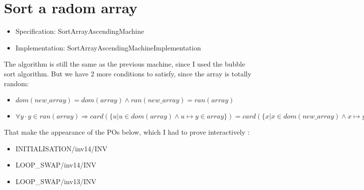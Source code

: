 \section{Sort a radom array}

\begin{itemize}
\item Specification: SortArrayAscendingMachine
\item Implementation: SortArrayAscendingMachineImplementation
\end{itemize}
The algorithm is still the same as the previous machine, since I used the bubble sort algorithm. 
But we have 2 more conditions to satisfy, since the array is totally random: 
\begin{itemize}
\item $dom(new\_array) = dom(array) \land ran(new\_array) = ran(array)$
\item $\forall y \cdot y \in ran(array) \Rightarrow card(\{u | u \in dom(array) \land u \mapsto y \in array\}) = card(\{x | x \in dom(new\_array) \land x \mapsto y \in new_array\})$
\end{itemize}

That make the appearance of the POs below, which I had to prove interactively :
\begin{itemize}
\item INITIALISATION/inv14/INV
\item LOOP\_SWAP/inv14/INV
\item LOOP\_SWAP/inv13/INV
\end{itemize}

